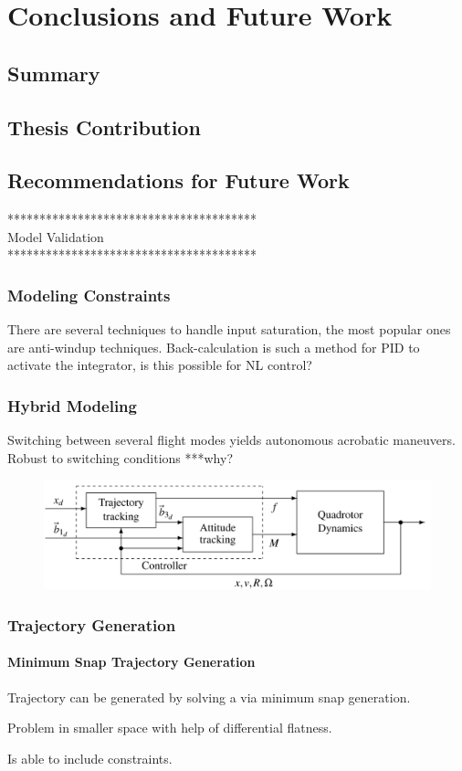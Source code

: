 \chapter{Conclusions and Future Work}\label{ch:conclusion}
\section{Summary}

\section{Thesis Contribution}

\section{Recommendations for Future Work}\label{ch:future}
***************************************\\
Model Validation\\

***************************************\\
\subsection{Modeling Constraints}
There are several techniques to handle input saturation, the most popular ones are anti-windup techniques. Back-calculation is such a method for PID to activate the integrator, is this possible for NL control?

\subsection{Hybrid Modeling}
Switching between several flight modes yields autonomous acrobatic maneuvers. Robust to switching conditions ***why?\\
\begin{figure}[h!]
	\centering
	\includegraphics[width=.45\textwidth]{./StyleStuff/LeeControlscheme.png}
	\caption{\label{fig:}}
\end{figure}		

\subsection{Trajectory Generation}
\subsubsection{Minimum Snap Trajectory Generation}

Trajectory can be generated by solving a  via minimum snap generation.

Problem in smaller space with help of differential flatness.

Is able to include constraints.
